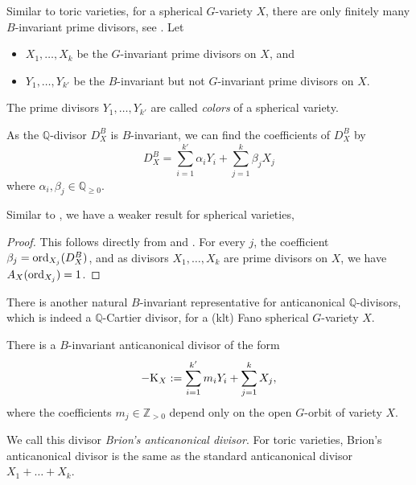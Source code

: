 

Similar to toric varieties, for a spherical $G$-variety $X$, there are only finitely many $B$-invariant prime divisors, see \cite[Theorem 2.2.2]{Pezzini_lec_sph_wond_vari}. Let
\begin{itemize}
    \item $X_1, \dots, X_k$ be the $G$-invariant prime divisors on $X$, and
    \item $Y_1, \dots, Y_{k'}$ be the $B$-invariant but not $G$-invariant prime divisors on $X$.
\end{itemize}
\begin{remark}
    The prime divisors $Y_1, \dots, Y_{k'}$ are called \emph{colors} of a spherical variety.
\end{remark}

As the $\mathbb{Q}$-divisor $D^B_X$ is $B$-invariant, we can find the coefficients of $D^B_X$ by 
\begin{equation}
    D^B_X = \sum_{i = 1}^{k'} \alpha_i Y_i + \sum_{j = 1}^{k} \beta_j X_j
\end{equation}
where $\alpha_i, \beta_j \in \mathbb{Q}_{\geq 0}$.

Similar to , we have a weaker result for spherical varieties,
\begin{proof}
    This follows directly from  and . For every $j$, the coefficient $\beta_j = \mathrm{ord}_{X_j}(D^B_X)$, and as divisors $X_1, \dots, X_k$ are prime divisors on $X$, we have $A_X(\mathrm{ord}_{X_j}) = 1$.
\end{proof}

There is another natural $B$-invariant representative for anticanonical $\mathbb{Q}$-divisors, which is indeed a $\mathbb{Q}$-Cartier divisor, for a (klt) Fano spherical $G$-variety $X$.
\begin{theorem}
    There is a $B$-invariant anticanonical divisor of the form
    \begin{equation*}
        -\cano_X := \sum_{i = 1}^{k'} m_i Y_i + \sum_{j = 1}^{k} X_j,
    \end{equation*}
    where the coefficients $m_j \in \mathbb{Z}_{> 0}$ depend only on the open $G$-orbit of variety $X$.
\end{theorem}
\begin{remark*}
    We call this divisor \emph{Brion's anticanonical divisor}. For toric varieties, Brion's anticanonical divisor is the same as the standard anticanonical divisor $X_1 + \dots + X_k$.
\end{remark*}

